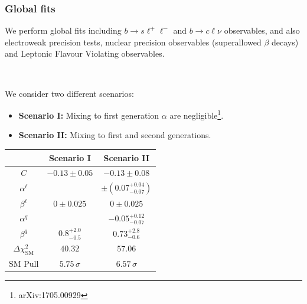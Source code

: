 \documentclass[mathserif, 10pt]{beamer}
\begin{document}
\begin{frame}
    \frametitle{Global fits}
    We perform global fits including $b\to s \ell^+\ell^-$ and
    $b\to c\ell\nu$ observables, and also electroweak precision tests,
    nuclear precision observables (superallowed $\beta$ decays) and Leptonic Flavour Violating observables.

    ~

    We consider two different scenarios:
    \begin{itemize}
        \item \textbf{Scenario I:} Mixing to first generation $\alpha$ are negligible\footnote[1]{arXiv:1705.00929}.
        \item \textbf{Scenario II:} Mixing to first and second generations.
    \end{itemize}
    \begin{center}\small
        \begin{tabular}{|c|c|c|}\hline
             & Scenario I & Scenario II \\\hline
            $C$ & $-0.13 \pm 0.05$ & $-0.13 \pm 0.08$             \\\hline
            $\alpha^\ell$ & & $\pm (0.07^{+0.04}_{-0.07})$ \\\hline
            $\beta^\ell$  & $0 \pm 0.025$ & $0 \pm 0.025$ \\\hline
            $\alpha^q$ & & $-0.05^{+0.12}_{-0.07}$ \\\hline
            $\beta^q$ & $0.8^{+2.0}_{-0.5}$ & $0.73^{+2.8}_{-0.6}$ \\\hline
            $\Delta \chi^2_\mathrm{SM}$ & $40.32$ & $57.06$ \\\hline
            SM Pull & $5.75\,\sigma$ & $6.57\,\sigma$               \\\hline
        \end{tabular}
    \end{center}
\end{frame}
\end{document}
